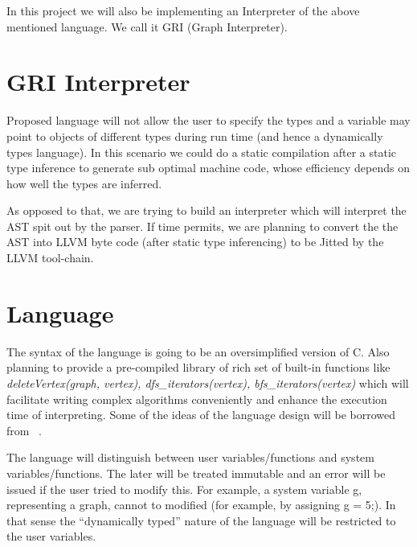 \documentclass[12,twoside]{article}
\begin{document}
 In this project we will also be implementing an Interpreter of the above
 mentioned language. We call it GRI (Graph Interpreter).


\vspace{1 mm}

\section{GRI Interpreter}
 
Proposed language will not allow the user to specify the types and a variable
  may point to objects of different types during run time (and hence a
      dynamically types language). In this scenario we could do a static
  compilation after a static type inference to generate sub optimal machine
  code, whose efficiency depends on how well the types are inferred.

  As opposed to that,  we are trying to build an interpreter which will
  interpret the AST spit out by the parser.  If time permits, we are planning
  to convert the the AST into LLVM byte code (after static type inferencing) to be Jitted
  by the LLVM tool-chain. 

\section{Language}

The syntax of the language is going to be an oversimplified version  of C.
  Also planning to provide a pre-compiled library of rich set of built-in functions like
  \emph{deleteVertex(graph, vertex), dfs\_iterators(vertex),
    bfs\_iterators(vertex)} which will facilitate writing complex algorithms
      conveniently and enhance the execution time of interpreting.
      Some of the ideas of the language design will be borrowed from
      ~\cite{Graphal}.

  The language will distinguish between user variables/functions and system variables/functions.
  The later will be treated immutable and an
  error will be issued if the user tried to modify this. For example, a system variable g,
  representing a graph, cannot to modified (for example, by assigning
      g = 5;).  In that sense the ``dynamically typed'' nature of the language
  will be restricted to the user variables.




\end{document}
